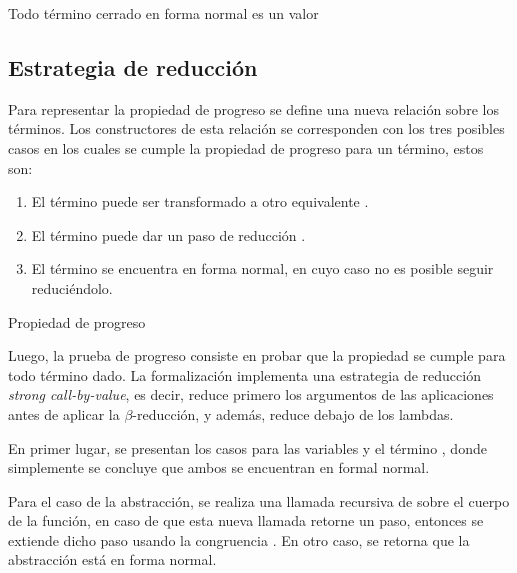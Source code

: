 \begin{codigo}
	Todo término cerrado en forma normal es un valor
\end{codigo}

\subsection{Estrategia de reducción}

Para representar la propiedad de progreso se define una nueva relación  sobre los términos.
Los constructores de esta relación se corresponden con los tres posibles casos en los cuales se cumple la propiedad de progreso para un término, estos son:
\begin{enumerate}
	\item El término puede ser transformado a otro equivalente \type{$\_\rightleftarrows\_$}.
	\item El término puede dar un paso de reducción \type{$\_\hookrightarrow\_$}.
	\item El término se encuentra en forma normal, en cuyo caso no es posible seguir reduciéndolo.
\end{enumerate}

\begin{codigo}
	Propiedad de progreso
\end{codigo}

Luego, la prueba de progreso consiste en probar que la propiedad  se cumple para todo término dado.
La formalización implementa una estrategia de reducción \textit{strong call-by-value}, es decir, reduce primero los argumentos de las aplicaciones antes de aplicar la $\beta$-reducción, y además, reduce debajo de los lambdas.

En primer lugar, se presentan los casos para las variables y el término \const{$\star$}, donde simplemente se concluye que ambos se encuentran en formal normal.


Para el caso de la abstracción, se realiza una llamada recursiva de  sobre el cuerpo de la función, en caso de que esta nueva llamada retorne un paso, entonces se extiende dicho paso usando la congruencia \const{$\zeta$}.
En otro caso, se retorna que la abstracción está en forma normal.


